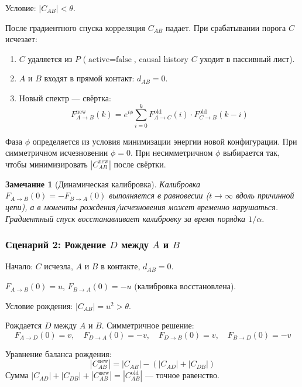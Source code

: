\documentclass[12pt,a4paper]{article}
\newtheorem{remark}{Замечание}[section]
\begin{document}
Условие: $|C_{AB}| < \theta$.

После градиентного спуска корреляция $C_{AB}$ падает. При срабатывании порога $C$ исчезает:

\begin{enumerate}
    \item $C$ удаляется из $P$ ($\text{active} = \text{false}$, causal history $C$ уходит в пассивный лист).
    \item $A$ и $B$ входят в прямой контакт: $d_{AB} = 0$.
    \item Новый спектр --- свёртка:
    \begin{equation}
        F_{A \to B}^{\text{new}}(k) = e^{i\phi} \sum_{i=0}^{k} F_{A \to C}^{\text{old}}(i) \cdot F_{C \to B}^{\text{old}}(k-i)
    \end{equation}
\end{enumerate}

Фаза $\phi$ определяется из условия минимизации энергии новой конфигурации. При симметричном исчезновении $\phi = 0$. При несимметричном $\phi$ выбирается так, чтобы минимизировать $|C_{AB}^{\text{new}}|$ после свёртки.

\begin{remark}[Динамическая калибровка]
Калибровка $F_{A \to B}(0) = -F_{B \to A}(0)$ выполняется в равновесии ($t \to \infty$ вдоль причинной цепи), а в моменты рождения/исчезновения может временно нарушаться. Градиентный спуск восстанавливает калибровку за время порядка $1/\alpha$.
\end{remark}

\subsubsection{Сценарий 2: Рождение $D$ между $A$ и $B$}

Начало: $C$ исчезла, $A$ и $B$ в контакте, $d_{AB} = 0$.

$F_{A \to B}(0) = u$, $F_{B \to A}(0) = -u$ (калибровка восстановлена).

Условие рождения: $|C_{AB}| = u^2 > \theta$.

Рождается $D$ между $A$ и $B$. Симметричное решение:
\begin{equation}
    F_{A \to D}(0) = v, \quad F_{D \to A}(0) = -v, \quad F_{D \to B}(0) = v, \quad F_{B \to D}(0) = -v
\end{equation}

Уравнение баланса рождения:
\begin{equation}
    |C_{AB}^{\text{new}}| = |C_{AB}| - (|C_{AD}| + |C_{DB}|)
\end{equation}
Сумма $|C_{AD}| + |C_{DB}| + |C_{AB}^{\text{new}}| = |C_{AB}^{\text{old}}|$ --- точное равенство.
\end{document}
